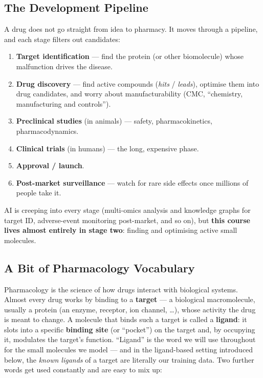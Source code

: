 \documentclass[11pt, oneside]{book}
\begin{document}
\subsection{The Development Pipeline}

A drug does not go straight from idea to pharmacy. It moves through a pipeline,
and each stage filters out candidates:

\begin{enumerate}
  \item \textbf{Target identification} --- find the protein (or other biomolecule)
        whose malfunction drives the disease.
  \item \textbf{Drug discovery} --- find active compounds (\emph{hits} / \emph{leads}),
        optimise them into drug candidates, and worry about manufacturability
        (CMC, ``chemistry, manufacturing and controls'').
  \item \textbf{Preclinical studies} (in animals) --- safety, pharmacokinetics,
        pharmacodynamics.
  \item \textbf{Clinical trials} (in humans) --- the long, expensive phase.
  \item \textbf{Approval / launch}.
  \item \textbf{Post-market surveillance} --- watch for rare side effects once
        millions of people take it.
\end{enumerate}

AI is creeping into every stage (multi-omics analysis and knowledge graphs for
target ID, adverse-event monitoring post-market, and so on), but
\textbf{this course lives almost entirely in stage two}: finding and optimising
active small molecules.

\subsection{A Bit of Pharmacology Vocabulary}

Pharmacology is the science of how drugs interact with biological systems. Almost
every drug works by binding to a \textbf{target} --- a biological macromolecule,
usually a protein (an enzyme, receptor, ion channel, \dots), whose activity the
drug is meant to change. A molecule that binds such a target is called a
\textbf{ligand}: it slots into a specific \textbf{binding site} (or ``pocket'') on
the target and, by occupying it, modulates the target's function. ``Ligand'' is the
word we will use throughout for the small molecules we model --- and in the
ligand-based setting introduced below, the \emph{known ligands} of a target are
literally our training data. Two further words get used constantly and are easy to
mix up:
\end{document}
